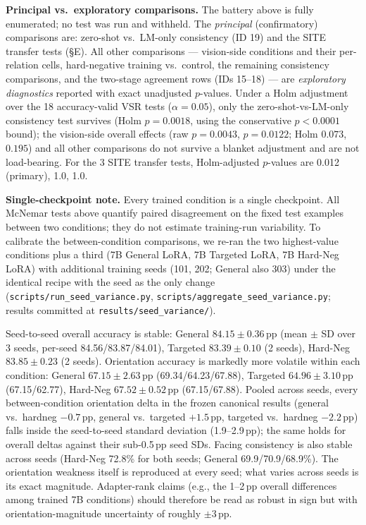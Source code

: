 \textbf{Principal vs.\ exploratory comparisons.} The battery above is fully
enumerated; no test was run and withheld. The \emph{principal}
(confirmatory) comparisons are: zero-shot vs.\ LM-only consistency (ID 19)
and the SITE transfer tests (\S E). All other comparisons --- vision-side
conditions and their per-relation cells, hard-negative training vs.\ control,
the remaining consistency comparisons, and the two-stage agreement rows
(IDs 15--18) --- are \emph{exploratory diagnostics} reported with exact
unadjusted $p$-values. Under a Holm adjustment over the 18 accuracy-valid
VSR tests ($\alpha{=}0.05$), only the zero-shot-vs-LM-only consistency test
survives (Holm $p{=}0.0018$, using the conservative $p{<}0.0001$ bound); the
vision-side overall effects (raw $p{=}0.0043$, $p{=}0.0122$; Holm $0.073$,
$0.195$) and all other comparisons do not survive a blanket adjustment and
are not load-bearing. For the 3 SITE transfer tests, Holm-adjusted $p$-values
are 0.012 (primary), 1.0, 1.0.

\textbf{Single-checkpoint note.} Every trained condition is a single
checkpoint. All McNemar tests above quantify paired disagreement on the fixed
test examples between two conditions; they do not estimate training-run
variability. To calibrate the between-condition comparisons, we re-ran the
two highest-value conditions plus a third (7B General LoRA, 7B Targeted LoRA,
7B Hard-Neg LoRA) with additional training seeds (101, 202; General also 303)
under the identical recipe with the seed as the only change
(\texttt{scripts/run\_seed\_variance.py}, \texttt{scripts/aggregate\_seed\_variance.py};
results committed at \texttt{results/seed\_variance/}).

Seed-to-seed overall accuracy is stable: General $84.15 \pm 0.36$\,pp
(mean $\pm$ SD over 3 seeds, per-seed 84.56/83.87/84.01), Targeted
$83.39 \pm 0.10$ (2 seeds), Hard-Neg $83.85 \pm 0.23$ (2 seeds). Orientation
accuracy is markedly more volatile within each condition: General
$67.15 \pm 2.63$\,pp (69.34/64.23/67.88), Targeted $64.96 \pm 3.10$\,pp
(67.15/62.77), Hard-Neg $67.52 \pm 0.52$\,pp (67.15/67.88). Pooled across
seeds, every between-condition orientation delta in the frozen canonical
results (general vs.\ hardneg $-0.7$\,pp, general vs.\ targeted $+1.5$\,pp,
targeted vs.\ hardneg $-2.2$\,pp) falls inside the seed-to-seed standard
deviation (1.9--2.9\,pp); the same holds for overall deltas against their
sub-0.5\,pp seed SDs. Facing consistency is also stable across seeds
(Hard-Neg 72.8\% for both seeds; General 69.9/70.9/68.9\%). The orientation
weakness itself is reproduced at every seed; what varies across seeds is its
exact magnitude. Adapter-rank claims (e.g., the 1--2\,pp overall differences
among trained 7B conditions) should therefore be read as robust in sign but
with orientation-magnitude uncertainty of roughly $\pm 3$\,pp.

